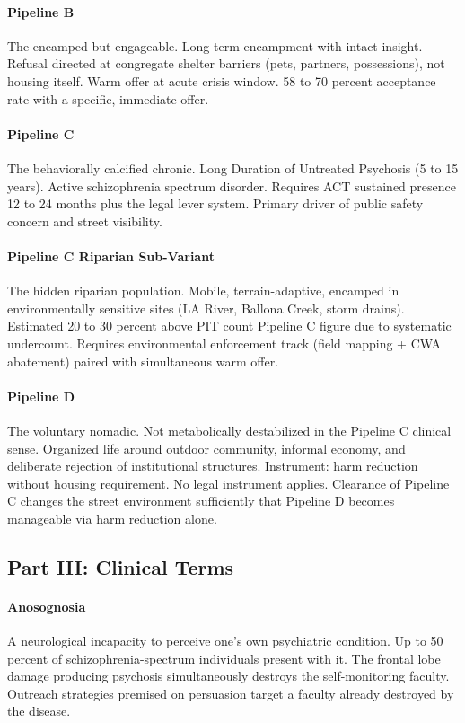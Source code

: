 {\paragraph{Pipeline B} The encamped but engageable. Long-term encampment with intact insight. Refusal directed at congregate shelter barriers (pets, partners, possessions), not housing itself. Warm offer at acute crisis window. 58 to 70 percent acceptance rate with a specific, immediate offer.

\paragraph{Pipeline C} The behaviorally calcified chronic. Long Duration of Untreated Psychosis (5 to 15 years). Active schizophrenia spectrum disorder. Requires ACT sustained presence 12 to 24 months plus the legal lever system. Primary driver of public safety concern and street visibility.

\paragraph{Pipeline C Riparian Sub-Variant} The hidden riparian population. Mobile, terrain-adaptive, encamped in environmentally sensitive sites (LA River, Ballona Creek, storm drains). Estimated 20 to 30 percent above PIT count Pipeline C figure due to systematic undercount. Requires environmental enforcement track (field mapping + CWA abatement) paired with simultaneous warm offer.

\paragraph{Pipeline D} The voluntary nomadic. Not metabolically destabilized in the Pipeline C clinical sense. Organized life around outdoor community, informal economy, and deliberate rejection of institutional structures. Instrument: harm reduction without housing requirement. No legal instrument applies. Clearance of Pipeline C changes the street environment sufficiently that Pipeline D becomes manageable via harm reduction alone.
\subsection*{Part III: Clinical Terms}

\paragraph{Anosognosia} A neurological incapacity to perceive one's own psychiatric condition. Up to 50 percent of schizophrenia-spectrum individuals present with it. The frontal lobe damage producing psychosis simultaneously destroys the self-monitoring faculty. Outreach strategies premised on persuasion target a faculty already destroyed by the disease.

}
